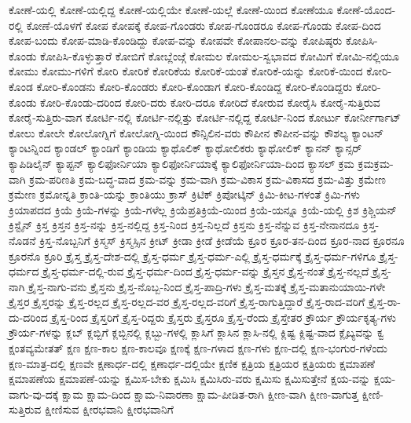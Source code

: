 {ಕೋಣೆ-ಯಲ್ಲಿ
ಕೋಣೆ-ಯಲ್ಲಿದ್ದ
ಕೋಣೆ-ಯಲ್ಲಿಯೇ
ಕೋಣೆ-ಯಲ್ಲೆ
ಕೋಣೆ-ಯಿಂದ
ಕೋಣೆಯೂ
ಕೋಣೆ-ಯೊಂದ-ರಲ್ಲಿ
ಕೋಣೆ-ಯೊಳಗೆ
ಕೋಪ
ಕೋಪಕ್ಕೆ
ಕೋಪ-ಗೊಂಡರು
ಕೋಪ-ಗೊಂಡರೂ
ಕೋಪ-ಗೊಂಡು
ಕೋಪ-ದಿಂದ
ಕೋಪ-ಬಂದು
ಕೋಪ-ಮಾಡಿ-ಕೊಂಡಿದ್ದು
ಕೋಪ-ವನ್ನು
ಕೋಪವೇ
ಕೋಪಾನಲ-ವನ್ನು
ಕೋಪಿಷ್ಠರು
ಕೋಪಿಸಿ-ಕೊಂಡು
ಕೋಪಿಸಿ-ಕೊಳ್ಳುತ್ತಾರೆ
ಕೋಬಿಗೆ
ಕೋಬ್ಲೆಂಜ್ಗೆ
ಕೋಮಲ
ಕೋಮಲ-ಸ್ವಭಾವದ
ಕೋಮಿಗೆ
ಕೋಮಿ-ನಲ್ಲಿಯೂ
ಕೋಮು
ಕೋಮು-ಗಳಿಗೆ
ಕೋರಿ
ಕೋರಿಕೆ
ಕೋರಿಕೆಯ
ಕೋರಿಕೆ-ಯಂತೆ
ಕೋರಿಕೆ-ಯನ್ನು
ಕೋರಿಕೆ-ಯಿಂದ
ಕೋರಿ-ಕೊಂಡ
ಕೋರಿ-ಕೊಂಡನು
ಕೋರಿ-ಕೊಂಡರು
ಕೋರಿ-ಕೊಂಡಾಗ
ಕೋರಿ-ಕೊಂಡಿದ್ದ
ಕೋರಿ-ಕೊಂಡಿದ್ದರು
ಕೋರಿ-ಕೊಂಡು
ಕೋರಿ-ಕೊಂಡು-ದರಿಂದ
ಕೋರಿ-ದರು
ಕೋರಿ-ದರೂ
ಕೋರಿದೆ
ಕೋರುವ
ಕೋರೈಸಿ
ಕೋರೈ-ಸುತ್ತಿರುವ
ಕೋರೈ-ಸುತ್ತಿರು-ವಾಗ
ಕೋರ್ಟಿ-ನಲ್ಲಿ
ಕೋರ್ಟಿ-ನಲ್ಲಿತ್ತು
ಕೋರ್ಟಿ-ನಲ್ಲಿದ್ದ
ಕೋರ್ಟಿ-ನಿಂದ
ಕೋರ್ಟು
ಕೋರ್ನೀರ್ಗಾಟ್
ಕೋಲು
ಕೋಲೇ
ಕೋಲೋಗ್ನಿಗೆ
ಕೋಲೋಗ್ನಿ-ಯಿಂದ
ಕೌನ್ಸಿಲಿನ-ವರು
ಕೌಪೀನ
ಕೌಪೀನ-ವನ್ನು
ಕೌಶಲ್ಯ
ಕ್ಯಾಂಟನ್
ಕ್ಯಾಂಟನ್ನಿಂದ
ಕ್ಯಾಂಡಲ್
ಕ್ಯಾಂಡಿಗೆ
ಕ್ಯಾಂಡಿಯ
ಕ್ಯಾಥೊಲಿಕ್
ಕ್ಯಾಥೋಲಿಕರು
ಕ್ಯಾಥೋಲಿಕ್
ಕ್ಯಾನನ್
ಕ್ಯಾನ್ಸರ್
ಕ್ಯಾಪಿಡಿಲೈನ್
ಕ್ಯಾಪ್ಟನ್
ಕ್ಯಾಲಿಫೋರ್ನಿಯಾ
ಕ್ಯಾಲಿಫೋರ್ನಿಯಾಕ್ಕೆ
ಕ್ಯಾಲಿಫೋರ್ನಿಯಾ-ದಿಂದ
ಕ್ಯಾಸಲ್
ಕ್ರಮ
ಕ್ರಮಕ್ರಮ-ವಾಗಿ
ಕ್ರಮ-ಪರಿಣತಿ
ಕ್ರಮ-ಬದ್ಧ-ವಾದ
ಕ್ರಮ-ವನ್ನು
ಕ್ರಮ-ವಾಗಿ
ಕ್ರಮ-ವಿಕಾಸ
ಕ್ರಮ-ವಿಕಾಸದ
ಕ್ರಮ-ವಿತ್ತು
ಕ್ರಮೇಣ
ಕ್ರಮೇಣ
ಕ್ರಮೋನ್ನತಿ
ಕ್ರಾಂತಿ-ಯನ್ನು
ಕ್ರಾಂತಿಯು
ಕ್ರಾಸ್
ಕ್ರಿಟಿಕ್
ಕ್ರಿಪೋಟ್ಕಿನ್
ಕ್ರಿಮಿ-ಕೀಟ-ಗಳಂತೆ
ಕ್ರಿಮಿ-ಗಳು
ಕ್ರಿಯಾಪದದ
ಕ್ರಿಯೆ
ಕ್ರಿಯೆ-ಗಳನ್ನು
ಕ್ರಿಯೆ-ಗಳೆಲ್ಲ
ಕ್ರಿಯೆಪ್ರತಿಕ್ರಿಯೆ-ಯಿಂದ
ಕ್ರಿಯೆ-ಯನ್ನೂ
ಕ್ರಿಯೆ-ಯಲ್ಲಿ
ಕ್ರಿಶ
ಕ್ರಿಶ್ಚಿಯನ್
ಕ್ರಿಸ್ಟೈನ್
ಕ್ರಿಸ್ತ
ಕ್ರಿಸ್ತನ
ಕ್ರಿಸ್ತ-ನನ್ನು
ಕ್ರಿಸ್ತ-ನಲ್ಲಿದ್ದ
ಕ್ರಿಸ್ತ-ನಿಂದ
ಕ್ರಿಸ್ತ-ನಿಲ್ಲದೆ
ಕ್ರಿಸ್ತನು
ಕ್ರಿಸ್ತ-ನೆನ್ನುವ
ಕ್ರಿಸ್ತ-ನೇನಾನದೂ
ಕ್ರಿಸ್ತ-ನೊಡನೆ
ಕ್ರಿಸ್ತ-ನೊಬ್ಬನಿಗೆ
ಕ್ರಿಸ್ಮಸ್
ಕ್ರಿಸ್ಮಸ್ಸಿನ
ಕ್ರೀಟ್
ಕ್ರೀಡಾ
ಕ್ರೀಡೆ
ಕ್ರೀಡೆಯೆ
ಕ್ರೂರ
ಕ್ರೂರ-ತನ-ದಿಂದ
ಕ್ರೂರ-ನಾದ
ಕ್ರೂರನೂ
ಕ್ರೂರನೊ
ಕ್ರೂರಿ
ಕ್ರೈಸ್ತ
ಕ್ರೈಸ್ತ-ದೇಶ-ದಲ್ಲಿ
ಕ್ರೈಸ್ತ-ಧರ್ಮ
ಕ್ರೈಸ್ತ-ಧರ್ಮ-ಎಲ್ಲಿ
ಕ್ರೈಸ್ತ-ಧರ್ಮಕ್ಕೆ
ಕ್ರೈಸ್ತ-ಧರ್ಮ-ಗಳಿಗೂ
ಕ್ರೈಸ್ತ-ಧರ್ಮದ
ಕ್ರೈಸ್ತ-ಧರ್ಮ-ದಲ್ಲಿ-ರುವ
ಕ್ರೈಸ್ತ-ಧರ್ಮ-ದಿಂದ
ಕ್ರೈಸ್ತ-ಧರ್ಮ-ವನ್ನು
ಕ್ರೈಸ್ತನ
ಕ್ರೈಸ್ತ-ನಂತೆ
ಕ್ರೈಸ್ತ-ನಲ್ಲದೆ
ಕ್ರೈಸ್ತ-ನಾಗಿ
ಕ್ರೈಸ್ತ-ನಾಗು-ವನು
ಕ್ರೈಸ್ತನು
ಕ್ರೈಸ್ತ-ನೊಬ್ಬ-ನಿಂದ
ಕ್ರೈಸ್ತ-ಪಾದ್ರಿ-ಗಳು
ಕ್ರೈಸ್ತ-ಮತಕ್ಕೆ
ಕ್ರೈಸ್ತ-ಮತಾನುಯಾಯಿ-ಗಳೇ
ಕ್ರೈಸ್ತರ
ಕ್ರೈಸ್ತರನ್ನು
ಕ್ರೈಸ್ತ-ರಲ್ಲದ
ಕ್ರೈಸ್ತ-ರಲ್ಲದ-ವರ
ಕ್ರೈಸ್ತ-ರಲ್ಲದ-ವರಿಗೆ
ಕ್ರೈಸ್ತ-ರಾಗುತ್ತಿದ್ದಾರೆ
ಕ್ರೈಸ್ತ-ರಾದ-ವರಿಗೆ
ಕ್ರೈಸ್ತ-ರಾ-ದು-ದರಿಂದ
ಕ್ರೈಸ್ತ-ರಿಂದ
ಕ್ರೈಸ್ತರಿಗೆ
ಕ್ರೈಸ್ತ-ರಿದ್ದರು
ಕ್ರೈಸ್ತರು
ಕ್ರೈಸ್ತರೂ
ಕ್ರೈಸ್ತ-ರೆಂದು
ಕ್ರೈಸ್ತೇತರ
ಕ್ರೌರ್ಯ
ಕ್ರೌರ್ಯಕೃತ್ಯ-ಗಳು
ಕ್ರೌರ್ಯ-ಗಳನ್ನು
ಕ್ಲಬ್
ಕ್ಲಬ್ಬಿಗೆ
ಕ್ಲಬ್ಬಿನಲ್ಲಿ
ಕ್ಲಬ್ಬು-ಗಳಲ್ಲಿ
ಕ್ಲಾಸಿಗೆ
ಕ್ಲಾಸಿನ
ಕ್ಲಾಸಿ-ನಲ್ಲಿ
ಕ್ಲಿಷ್ಟ
ಕ್ಲಿಷ್ಟ-ವಾದ
ಕ್ಲೈಬ್ಯವನ್ನು
ಕ್ವ
ಕ್ಷಂತವ್ಯಮೇತತ್
ಕ್ಷಣ
ಕ್ಷಣ-ಕಾಲ
ಕ್ಷಣ-ಕಾಲವೂ
ಕ್ಷಣಕ್ಕೆ
ಕ್ಷಣ-ಗಳಾದ
ಕ್ಷಣ-ಗಳು
ಕ್ಷಣ-ದಲ್ಲಿ
ಕ್ಷಣ-ಭಂಗುರ-ಗಳೆಂದು
ಕ್ಷಣ-ಮಾತ್ರ-ದಲ್ಲಿ
ಕ್ಷಣವೇ
ಕ್ಷಣಾರ್ಧ-ದಲ್ಲಿ
ಕ್ಷಣಾರ್ಧ-ದಲ್ಲಿಯೇ
ಕ್ಷಣಿಕ
ಕ್ಷತ್ರಿಯ
ಕ್ಷತ್ರಿಯರ
ಕ್ಷತ್ರಿಯರು
ಕ್ಷಮಾಪಣೆ
ಕ್ಷಮಾಪಣೆಯ
ಕ್ಷಮಾಪಣೆ-ಯನ್ನು
ಕ್ಷಮಿಸ-ಬೇಕು
ಕ್ಷಮಿಸಿ
ಕ್ಷಮಿಸಿರು-ವರು
ಕ್ಷಮಿಸು
ಕ್ಷಮಿಸುತ್ತೇನೆ
ಕ್ಷಯ-ವನ್ನು
ಕ್ಷಯ-ವಾಗು-ವು-ದಕ್ಕೆ
ಕ್ಷಾಮ
ಕ್ಷಾಮ-ದಿಂದ
ಕ್ಷಾಮ-ನಿವಾರಣಾ
ಕ್ಷಾಮ-ಪೀಡಿತ-ರಾಗಿ
ಕ್ಷೀಣ-ವಾಗಿ
ಕ್ಷೀಣ-ವಾಗುತ್ತ
ಕ್ಷೀಣಿ-ಸುತ್ತಿರುವ
ಕ್ಷೀಣಿಸುವ
ಕ್ಷೀರಭವಾನಿ
ಕ್ಷೀರಭವಾನಿಗೆ
}
